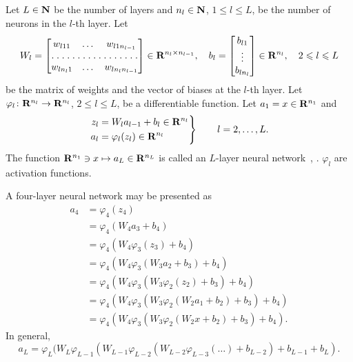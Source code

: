 Let $L \in \mathbf{N}$ be the number of layers and $n_l \in \mathbf{N}$,
$1 \leq l \leq L$, be the number of neurons in the $l$-th layer. Let
\begin{equation*}
  W_l =
  \begin{bmatrix}
    w_{l11} & \dots & w_{l1n_{l - 1}} \\
    \hdotsfor[1.5]{3} \\
    w_{ln_l1} & \dots & w_{ln_ln_{l - 1}}
  \end{bmatrix} \in \realn^{n_l \times n_{l - 1}},
  \quad
  b_l =
  \begin{bmatrix}
    b_{l1} \\
    \vdots \\
    b_{ln_l}
  \end{bmatrix} \in \realn^{n_l},
  \quad
  2 \leq l \leq L
\end{equation*}
be the matrix of weights and the vector of biases at the $l$-th layer.
Let $\varphi_l \colon \mathbf{R}^{n_l} \rightarrow \mathbf{R}^{n_l}$, $2 \leq
l \leq L$, be a differentiable function. Let $a_1 = x \in
\mathbf{R}^{n_1}$ and
\begin{equation*}
  \left.\begin{aligned}
    z_l &= W_la_{l - 1} + b_l \in \mathbf{R}^{n_l} \\
    a_l &= \varphi_l(z_l) \in \mathbf{R}^{n_l}
  \end{aligned}
  \right\}
  \qquad l = 2, \ldots, L.
\end{equation*}
The function $\mathbf{R}^{n_1} \ni x \mapsto a_L \in \mathbf{R}^{n_L}$ is
called an $L$-layer neural network~\cite [section~1.2.2]
{aggarwal-2018}, \cite [page 866] {higham-2019}. $\varphi_l$ are
activation functions.

A four-layer neural network may be presented as
\begin{equation*}
  \begin{split}
    a_4 &= \varphi_4(z_4) \\
    &= \varphi_4(W_4a_3 + b_4) \\
    &= \varphi_4(W_4\varphi_3(z_3) + b_4) \\
    &= \varphi_4(W_4\varphi_3(W_3a_2 + b_3) + b_4) \\
    &= \varphi_4(W_4\varphi_3(W_3\varphi_2(z_2) + b_3) + b_4) \\
    &= \varphi_4(W_4\varphi_3(W_3\varphi_2(W_2a_1 + b_2) + b_3) + b_4)
    \\
    &= \varphi_4(W_4\varphi_3(W_3\varphi_2(W_2x + b_2) + b_3) + b_4).
  \end{split}
\end{equation*}
In general,
\begin{equation} \label{eq:neuralnet_function_f}
  a_L = \varphi_L(W_L\varphi_{L - 1}(W_{L - 1}\varphi_{L - 2}(W_{L -
    2}\varphi_{L - 3}(\ldots) + b_{L - 2}) + b_{L - 1} + b_L).
\end{equation}

